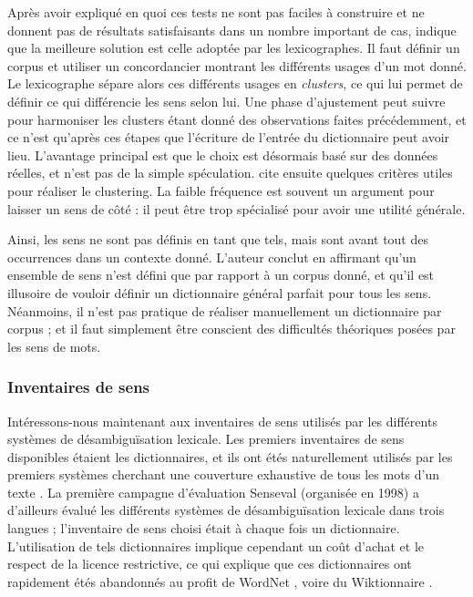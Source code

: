 Après avoir expliqué en quoi ces tests ne sont pas faciles à construire et ne
donnent pas de résultats satisfaisants dans un nombre important de cas,
\cite{kilgarriff1997don} indique que la meilleure solution est celle adoptée
par les lexicographes. Il faut définir un corpus et utiliser un concordancier
montrant les différents usages d'un mot donné. Le lexicographe sépare alors ces
différents usages en \textit{clusters}, ce qui lui permet de définir ce qui
différencie les sens selon lui. Une phase d'ajustement peut suivre pour
harmoniser les clusters étant donné des observations faites précédemment, et ce
n'est qu'après ces étapes que l'écriture de l'entrée du dictionnaire peut avoir
lieu. L'avantage principal est que le choix est désormais basé sur des données
réelles, et n'est pas de la simple spéculation. \cite{kilgarriff1997don} cite
ensuite quelques critères utiles pour réaliser le clustering. La faible
fréquence est souvent un argument pour laisser un sens de côté : il peut être
trop spécialisé pour avoir une utilité générale.

Ainsi, les sens ne sont pas définis en tant que tels, mais sont avant tout des
occurrences dans un contexte donné. L'auteur conclut en affirmant qu'un
ensemble de sens n'est défini que par rapport à un corpus donné, et qu'il est
illusoire de vouloir définir un dictionnaire général parfait pour tous les
sens. Néanmoins, il n'est pas pratique de réaliser manuellement un dictionnaire
par corpus ; et il faut simplement être conscient des difficultés théoriques
posées par les sens de mots. 

\subsubsection{Inventaires de sens}

Intéressons-nous maintenant aux inventaires de sens utilisés par les différents
systèmes de désambiguïsation lexicale. Les premiers inventaires de sens
disponibles étaient les dictionnaires, et ils ont étés naturellement utilisés
par les premiers systèmes cherchant une couverture exhaustive de tous les mots
d'un texte \citep{lesk1986automatic}. La première campagne d'évaluation
Senseval (organisée en 1998) \citep{kilgarriff2000introduction} a d'ailleurs
évalué les différents systèmes de désambiguïsation lexicale dans trois langues
; l'inventaire de sens choisi était à chaque fois un dictionnaire.
L'utilisation de tels dictionnaires implique cependant un coût d'achat et le
respect de la licence restrictive, ce qui explique que ces dictionnaires ont
rapidement étés abandonnés au profit de WordNet
\citep{edmonds2002introduction}, voire du Wiktionnaire
\citep{mouton2010jaws}.%

